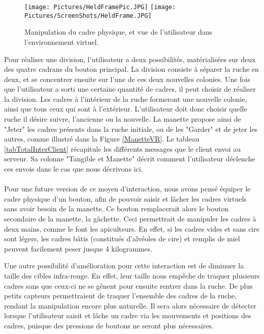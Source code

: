 	\begin{figure}
	\centering
	\texttt{[image: Pictures/HeldFramePic.JPG]}
	\texttt{[image: Pictures/ScreenShots/HeldFrame.JPG]}
	\caption{Manipulation du cadre physique, et vue de l'utilisateur dans l'environnement virtuel.}
	\label{equiVRTUI}
	\end{figure}
		
		Pour réaliser une division, l'utilisateur a deux possibilités, matérialisées sur deux des quatre cadrans du bouton principal. La division consiste à séparer la ruche en deux, et se concentrer ensuite sur l'une de ces deux nouvelles colonies. Une fois que l'utilisateur a sorti une certaine quantité de cadres, il peut choisir de réaliser la division. Les cadres à l'intérieur de la ruche formeront une nouvelle colonie, ainsi que tous ceux qui sont à l'extérieur. L'utilisateur doit donc choisir quelle ruche il désire suivre, l'ancienne ou la nouvelle. La manette propose ainsi de "Jeter" les cadres présents dans la ruche initiale, ou de les "Garder" et de jeter les autres, comme illustré dans la Figure \ref{ManetteVR}. Le tableau \ref{tabTotalInterClient} récapitule les différents messages que le client envoi au serveur. Sa colonne "Tangible et Manette" décrit comment l'utilisateur déclenche ces envois dans le cas que nous décrivons ici.

		\paragraph{}		
		Pour une future version de ce moyen d'interaction, nous avons pensé équiper le cadre physique d'un bouton, afin de pouvoir saisir et lâcher les cadres virtuels sans avoir besoin de la manette. Ce bouton remplacerait alors le bouton secondaire de la manette, la gâchette. Ceci permettrait de manipuler les cadres à deux mains, comme le font les apiculteurs. En effet, si les cadres vides et sans cire sont légers, les cadres bâtis (constitués d'alvéoles de cire) et remplis de miel peuvent facilement peser jusque 4 kilogrammes.
		
		Une autre possibilité d'amélioration pour cette interaction est de diminuer la taille des cibles infra-rouge. En effet, leur taille nous empêche de traquer plusieurs cadres sans que ceux-ci ne se gênent pour ensuite rentrer dans la ruche. De plus petits capteurs permettraient de traquer l'ensemble des cadres de la ruche, rendant la manipulation encore plus naturelle. Il sera alors nécessaire de détecter lorsque l'utilisateur saisit et lâche un cadre via les mouvements et positions des cadres, puisque des pressions de boutons ne seront plus nécessaires.
		
